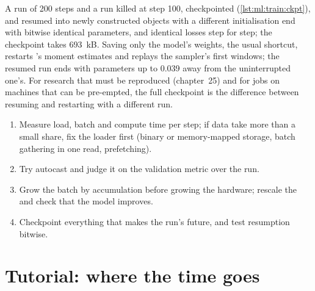 A run of 200 steps and a run killed at step 100, checkpointed (\cref{lst:ml:train:ckpt}), and resumed into newly constructed
objects with a different initialisation end with bitwise identical parameters, and identical losses step for step; the checkpoint
takes 693~kB. Saving only the model's weights, the usual shortcut, restarts 's moment estimates and replays the sampler's
first windows; the resumed run ends with parameters up to 0.039 away from the uninterrupted one's. For research that must be
reproduced (chapter~25) and for jobs on machines that can be pre-empted, the full checkpoint is the difference between resuming
and restarting with a different run.

\begin{method}\label{met:ml:train:method}
\begin{enumerate}
\item Measure load, batch and compute time per step; if data take more than a small share, fix the loader first (binary or
memory-mapped storage, batch gathering in one read, prefetching).
\item Try  autocast and judge it on the validation metric over the run.
\item Grow the batch by accumulation before growing the hardware; rescale the  and check that the model improves.
\item Checkpoint everything that makes the run's future, and test resumption bitwise.
\end{enumerate}
\end{method}

\section{Tutorial: where the time goes}\label{tut:ml:training-infrastructure:tut}


